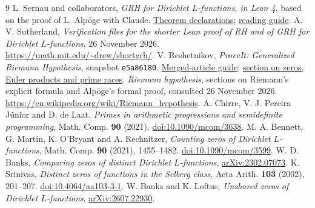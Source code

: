 \documentclass[11pt]{article}
\begin{document}
\begin{thebibliography}{9}
 L. Sernau and collaborators, \emph{GRH for Dirichlet $L$-functions, in Lean 4}, based on the proof of L. Alp\"oge with Claude. \href{https://github.com/lsernau/grh-lean/blob/72fead102f663d5c7a407964a13dc0cf9d977207/grh/src/Main.lean}{Theorem declarations};
\href{https://github.com/lsernau/grh-lean/blob/72fead102f663d5c7a407964a13dc0cf9d977207/grh/GUIDE.md}{reading guide}.
 A. V. Sutherland, \emph{Verification files for the shorter Lean proof of RH and of GRH for Dirichlet $L$-functions}, 26 November 2026. \url{https://math.mit.edu/~drew/shortgrh/}.
 V. Reshetnikov, \emph{ProveIt: Generalized Riemann Hypothesis}, snapshot \texttt{e5a86180}. \href{https://github.com/VladimirReshetnikov/ProveIt/blob/e5a86180eeea85173073bedb1d5edef3c5e6855c/Analysis/GeneralizedRiemannHypothesis/Article/README.md}{Merged-article guide};
\href{https://github.com/VladimirReshetnikov/ProveIt/blob/e5a86180eeea85173073bedb1d5edef3c5e6855c/Analysis/GeneralizedRiemannHypothesis/Article/sections/zer.tex}{section on zeros, Euler products and prime races}.
 \emph{Riemann hypothesis}, sections on Riemann's explicit formula and Alp\"oge's formal proof, consulted 26 November 2026. \url{https://en.wikipedia.org/wiki/Riemann_hypothesis}.
 A. Chirre, V. J. Pereira J\'unior and D. de Laat, \emph{Primes in arithmetic progressions and semidefinite programming}, Math. Comp. \textbf{90} (2021). \href{https://doi.org/10.1090/mcom/3638}{doi:10.1090/mcom/3638}.
 M. A. Bennett, G. Martin, K. O'Bryant and A. Rechnitzer, \emph{Counting zeros of Dirichlet $L$-functions}, Math. Comp. \textbf{90} (2021), 1455--1482. \href{https://doi.org/10.1090/mcom/3599}{doi:10.1090/mcom/3599}.
 W. D. Banks, \emph{Comparing zeros of distinct Dirichlet $L$-functions}, \href{https://arxiv.org/abs/2302.07073}{arXiv:2302.07073}.
 K. Srinivas, \emph{Distinct zeros of functions in the Selberg class}, Acta Arith. \textbf{103} (2002), 201--207. \href{https://doi.org/10.4064/aa103-3-1}{doi:10.4064/aa103-3-1}.
 W. Banks and K. Loftus, \emph{Unshared zeros of Dirichlet $L$-functions}, \href{https://arxiv.org/abs/2607.22930}{arXiv:2607.22930}.
\end{thebibliography}
\end{document}

